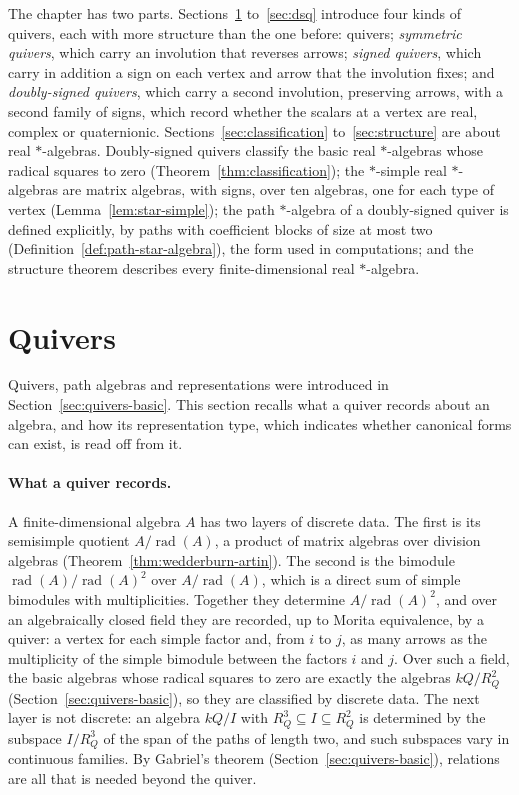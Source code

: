 \documentclass[12pt, a4paper]{report}
\theoremstyle{plain}
\theoremstyle{definition}
\theoremstyle{remark}
\theoremstyle{plain}
\newcommand{\rad}[0]{\operatorname{rad}} %
\begin{document}
The chapter has two parts. Sections~\ref{sec:quivers} to~\ref{sec:dsq} introduce four kinds of quivers, each with more structure than the one before: quivers; \emph{symmetric quivers}, which carry an involution that reverses arrows; \emph{signed quivers}, which carry in addition a sign on each vertex and arrow that the involution fixes; and \emph{doubly-signed quivers}, which carry a second involution, preserving arrows, with a second family of signs, which record whether the scalars at a vertex are real, complex or quaternionic. Sections~\ref{sec:classification} to~\ref{sec:structure} are about real $*$-algebras. Doubly-signed quivers classify the basic real $*$-algebras whose radical squares to zero (Theorem~\ref{thm:classification}); the $*$-simple real $*$-algebras are matrix algebras, with signs, over ten algebras, one for each type of vertex (Lemma~\ref{lem:star-simple}); the path $*$-algebra of a doubly-signed quiver is defined explicitly, by paths with coefficient blocks of size at most two (Definition~\ref{def:path-star-algebra}), the form used in computations; and the structure theorem describes every finite-dimensional real $*$-algebra.

\section{Quivers}
\label{sec:quivers}
Quivers, path algebras and representations were introduced in Section~\ref{sec:quivers-basic}. This section recalls what a quiver records about an algebra, and how its representation type, which indicates whether canonical forms can exist, is read off from it.

\paragraph{What a quiver records.} A finite-dimensional algebra $A$ has two layers of discrete data. The first is its semisimple quotient $A/\rad(A)$, a product of matrix algebras over division algebras (Theorem~\ref{thm:wedderburn-artin}). The second is the bimodule $\rad(A)/\rad(A)^2$ over $A/\rad(A)$, which is a direct sum of simple bimodules with multiplicities. Together they determine $A/\rad(A)^2$, and over an algebraically closed field they are recorded, up to Morita equivalence, by a quiver: a vertex for each simple factor and, from $i$ to $j$, as many arrows as the multiplicity of the simple bimodule between the factors $i$ and $j$. Over such a field, the basic algebras whose radical squares to zero are exactly the algebras $kQ/R_Q^2$ (Section~\ref{sec:quivers-basic}), so they are classified by discrete data. The next layer is not discrete: an algebra $kQ/I$ with $R_Q^3\subseteq I\subseteq R_Q^2$ is determined by the subspace $I/R_Q^3$ of the span of the paths of length two, and such subspaces vary in continuous families. By Gabriel's theorem (Section~\ref{sec:quivers-basic}), relations are all that is needed beyond the quiver.
\end{document}
